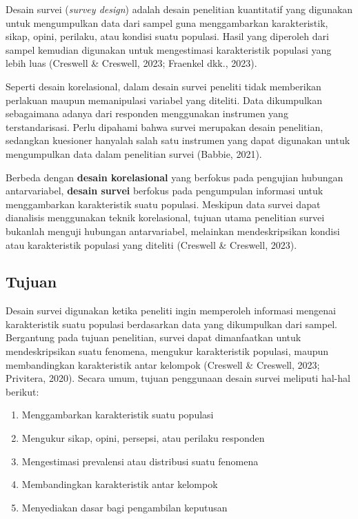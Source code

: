 \documentclass[
  indonesian,
  letterpaper,
  DIV=11,
  numbers=noendperiod]{scrreprt}
\providecommand{\tightlist}{%
  \setlength{\itemsep}{0pt}\setlength{\parskip}{0pt}}
\begin{document}
Desain survei (\emph{survey design}) adalah desain penelitian
kuantitatif yang digunakan untuk mengumpulkan data dari sampel guna
menggambarkan karakteristik, sikap, opini, perilaku, atau kondisi suatu
populasi. Hasil yang diperoleh dari sampel kemudian digunakan untuk
mengestimasi karakteristik populasi yang lebih luas (Creswell \&
Creswell, 2023; Fraenkel dkk., 2023).

Seperti desain korelasional, dalam desain survei peneliti tidak
memberikan perlakuan maupun memanipulasi variabel yang diteliti. Data
dikumpulkan sebagaimana adanya dari responden menggunakan instrumen yang
terstandarisasi. Perlu dipahami bahwa survei merupakan desain
penelitian, sedangkan kuesioner hanyalah salah satu instrumen yang dapat
digunakan untuk mengumpulkan data dalam penelitian survei (Babbie,
2021).

Berbeda dengan \textbf{desain korelasional} yang berfokus pada pengujian
hubungan antarvariabel, \textbf{desain survei} berfokus pada pengumpulan
informasi untuk menggambarkan karakteristik suatu populasi. Meskipun
data survei dapat dianalisis menggunakan teknik korelasional, tujuan
utama penelitian survei bukanlah menguji hubungan antarvariabel,
melainkan mendeskripsikan kondisi atau karakteristik populasi yang
diteliti (Creswell \& Creswell, 2023).

\subsection{Tujuan}\label{tujuan-1}

Desain survei digunakan ketika peneliti ingin memperoleh informasi
mengenai karakteristik suatu populasi berdasarkan data yang dikumpulkan
dari sampel. Bergantung pada tujuan penelitian, survei dapat
dimanfaatkan untuk mendeskripsikan suatu fenomena, mengukur
karakteristik populasi, maupun membandingkan karakteristik antar
kelompok (Creswell \& Creswell, 2023; Privitera, 2020). Secara umum,
tujuan penggunaan desain survei meliputi hal-hal berikut:

\begin{enumerate}
\def\labelenumi{\arabic{enumi}.}
\tightlist
\item
  Menggambarkan karakteristik suatu populasi
\item
  Mengukur sikap, opini, persepsi, atau perilaku responden
\item
  Mengestimasi prevalensi atau distribusi suatu fenomena
\item
  Membandingkan karakteristik antar kelompok
\item
  Menyediakan dasar bagi pengambilan keputusan
\end{enumerate}
\end{document}
